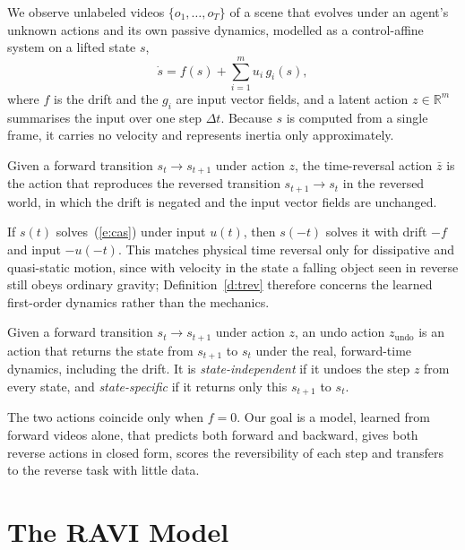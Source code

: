 \documentclass{jcse}
\newcommand{\method}{RAVI}
\newcommand{\zb}{\bar{z}}
\newcommand{\zundo}{z_{\mathrm{undo}}}
\newcommand{\R}{\mathbb{R}}
\begin{document}
We observe unlabeled videos $\{o_1,\dots,o_T\}$ of a scene that evolves under an agent's unknown actions and its own passive dynamics, modelled as a control-affine system on a lifted state $s$,
\begin{equation}
\dot{s}=f(s)+\sum_{i=1}^m u_i\,g_i(s),
\label{e:cas}
\end{equation}
where $f$ is the drift and the $g_i$ are input vector fields, and a latent action $z\in\R^m$ summarises the input over one step $\Delta t$.
Because $s$ is computed from a single frame, it carries no velocity and represents inertia only approximately.

\begin{definition}
\label{d:trev}
Given a forward transition $s_t\to s_{t+1}$ under action $z$, the time-reversal action $\zb$ is the action that reproduces the reversed transition $s_{t+1}\to s_t$ in the reversed world, in which the drift is negated and the input vector fields are unchanged.
\end{definition}

If $s(t)$ solves~(\ref{e:cas}) under input $u(t)$, then $s(-t)$ solves it with drift $-f$ and input $-u(-t)$.
This matches physical time reversal only for dissipative and quasi-static motion, since with velocity in the state a falling object seen in reverse still obeys ordinary gravity; Definition~\ref{d:trev} therefore concerns the learned first-order dynamics rather than the mechanics.

\begin{definition}
\label{d:undo}
Given a forward transition $s_t\to s_{t+1}$ under action $z$, an undo action $\zundo$ is an action that returns the state from $s_{t+1}$ to $s_t$ under the real, forward-time dynamics, including the drift.
It is \emph{state-independent} if it undoes the step $z$ from every state, and \emph{state-specific} if it returns only this $s_{t+1}$ to $s_t$.
\end{definition}

The two actions coincide only when $f=0$.
Our goal is a model, learned from forward videos alone, that predicts both forward and backward, gives both reverse actions in closed form, scores the reversibility of each step and transfers to the reverse task with little data.

\section{The {\method} Model} \label{s:method}
\end{document}
